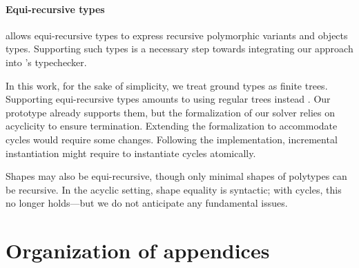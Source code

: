\documentclass[acmsmall,screen,nonacm,review]{acmart}
\begin{document}
%

\paragraph{Equi-recursive types}
\label {sec/rec-types}

\OCaml allows equi-recursive types to express recursive polymorphic variants
and objects types. Supporting such types is a necessary step towards integrating
our approach into \OCaml's typechecker.

In this work, for the sake of simplicity, we treat ground types as finite
trees. Supporting equi-recursive types amounts to using regular trees instead
\citep*{Pottier-Remy/emlti}. Our prototype already supports them,
but the formalization of our solver relies on acyclicity to ensure
termination.  Extending the formalization to accommodate cycles would
require some changes.  Following the implementation, incremental
instantiation might require to instantiate cycles atomically.

Shapes may also be equi-recursive, though only minimal shapes of polytypes
can be recursive. In the acyclic setting, shape equality is syntactic; with
cycles, this no longer holds---but we do not anticipate any fundamental issues.




\newpage
\appendix

\section*{\Large Organization of appendices}
\label{app:outline}
\end{document}
